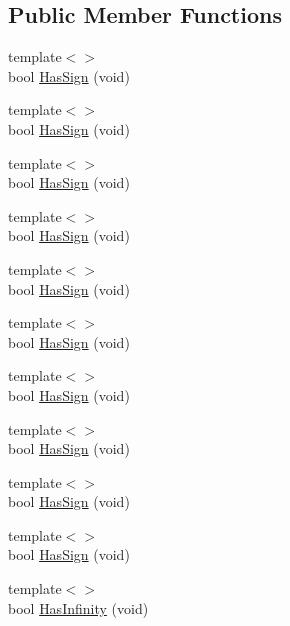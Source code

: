 \subsection*{Public Member Functions}
\begin{DoxyCompactItemize}
\item 
{\footnotesize template$<$$>$ }\\bool \hyperlink{classcmn_type_traits_acb0f6eacbdf80dbcc5e8e758e0e24d0c}{Has\+Sign} (void)
\item 
{\footnotesize template$<$$>$ }\\bool \hyperlink{classcmn_type_traits_a9f118cdb6057e31437e0d6f107239e75}{Has\+Sign} (void)
\item 
{\footnotesize template$<$$>$ }\\bool \hyperlink{classcmn_type_traits_af4906116c12f1ab077791c6015ba1361}{Has\+Sign} (void)
\item 
{\footnotesize template$<$$>$ }\\bool \hyperlink{classcmn_type_traits_ae18425f51cf45c3bb26d02c47dc507dc}{Has\+Sign} (void)
\item 
{\footnotesize template$<$$>$ }\\bool \hyperlink{classcmn_type_traits_a6af1de5401258a3ebd7c9e0582ee7c37}{Has\+Sign} (void)
\item 
{\footnotesize template$<$$>$ }\\bool \hyperlink{classcmn_type_traits_aa349bad32d0e716ca080558cc0bc86f0}{Has\+Sign} (void)
\item 
{\footnotesize template$<$$>$ }\\bool \hyperlink{classcmn_type_traits_ab3d1a289efe069c6f851253b941af2b5}{Has\+Sign} (void)
\item 
{\footnotesize template$<$$>$ }\\bool \hyperlink{classcmn_type_traits_a4afa313fd9222ccccfc624ed48fb70be}{Has\+Sign} (void)
\item 
{\footnotesize template$<$$>$ }\\bool \hyperlink{classcmn_type_traits_a0c475b5070e31bc03dcd571ac5e4f128}{Has\+Sign} (void)
\item 
{\footnotesize template$<$$>$ }\\bool \hyperlink{classcmn_type_traits_adcbbecea70ccde45a77b97dc226b3c73}{Has\+Sign} (void)
\item 
{\footnotesize template$<$$>$ }\\bool \hyperlink{classcmn_type_traits_ad8c4afdf017e81fd8f05cb66164c74af}{Has\+Infinity} (void)
\item 

\end{DoxyCompactItemize}
